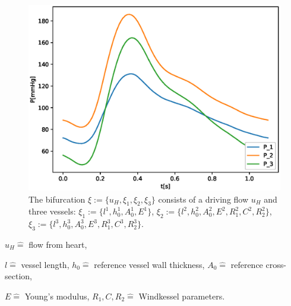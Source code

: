 \documentclass{beamer}
\begin{document}
\begin{frame}
\begin{figure}
\begin{center}
\begin{minipage}[t][0.35\paperheight][t]{\textwidth}
\begin{minipage}{0.44\textwidth}
				\includegraphics[width=\textwidth]{images/compare_output_params_P_P.eps}
			\end{minipage}
			\end{minipage}
\begin{minipage}[t][0.35\paperheight][t]{\textwidth}
			\begin{minipage}{0.44\textwidth}
				\caption*{The bifurcation $\xi := \{u_H, \xi_1, \xi_2, \xi_3\}$ consists of a driving flow $u_H$ and three vessels: $\xi_1 := \{l^1, h_0^1, A_0^1, E^1\}$, $\xi_2 := \{l^2, h_0^2, A_0^2, E^2, R_1^2, C^2, R_2^2\}$, $\xi_3 := \{l^3, h_0^3, A_0^3, E^3, R_1^3, C^3, R_2^3\}.$}
			\end{minipage}
			\hfill
			\begin{minipage}{0.44\textwidth}
			\end{minipage}
			\end{minipage}
		\end{center}
	\end{figure}
\begin{minipage}[t][0.1\paperheight][t]{\textwidth}
	{\tiny \centering 
		$u_H \hat{=}$ flow from heart,

		$l \hat{=}$ vessel length,
		$h_0 \hat{=}$ reference vessel wall thickness,
		$A_0 \hat{=}$ reference cross-section,

		$E \hat{=}$ Young's modulus,
		$R_1, C, R_2 \hat{=}$ Windkessel parameters.
	\par}
			\end{minipage}
\end{frame}
\end{document}
